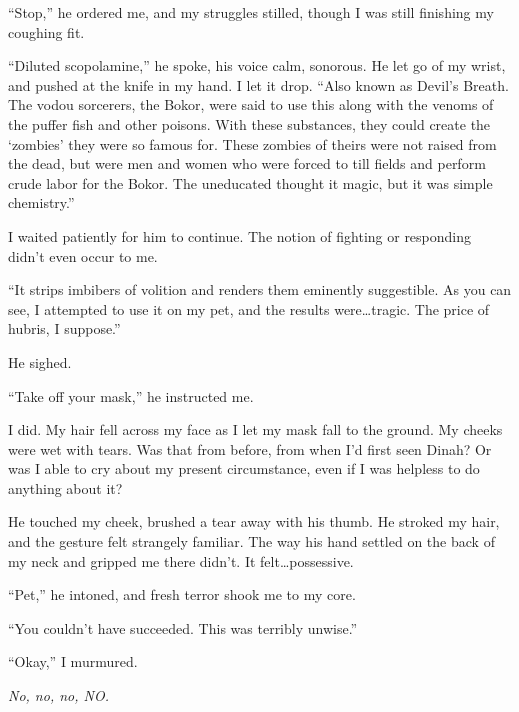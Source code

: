 ``Stop,'' he ordered me, and my struggles stilled, though I was still finishing my coughing fit.



``Diluted scopolamine,'' he spoke, his voice calm, sonorous.  He let go of my wrist, and pushed at the knife in my hand.  I let it drop.  ``Also known as Devil's Breath.  The vodou sorcerers, the Bokor, were said to use this along with the venoms of the puffer fish and other poisons.  With these substances, they could create the `zombies' they were so famous for.  These zombies of theirs were not raised from the dead, but were men and women who were forced to till fields and perform crude labor for the Bokor.  The uneducated thought it magic, but it was simple chemistry.''



I waited patiently for him to continue.  The notion of fighting or responding didn't even occur to me.



``It strips imbibers of volition and renders them eminently suggestible.  As you can see, I attempted to use it on my pet, and the results were\ldots tragic.  The price of hubris, I suppose.''



He sighed.



``Take off your mask,'' he instructed me.



I did.  My hair fell across my face as I let my mask fall to the ground.  My cheeks were wet with tears.  Was that from before, from when I'd first seen Dinah?  Or was I able to cry about my present circumstance, even if I was helpless to do anything about it?



He touched my cheek, brushed a tear away with his thumb.  He stroked my hair, and the gesture felt strangely familiar.  The way his hand settled on the back of my neck and gripped me there didn't.  It felt\ldots possessive.



``Pet,'' he intoned, and fresh terror shook me to my core.



``You couldn't have succeeded.  This was terribly unwise.''



``Okay,'' I murmured.



\emph{No, no, no, NO.}



